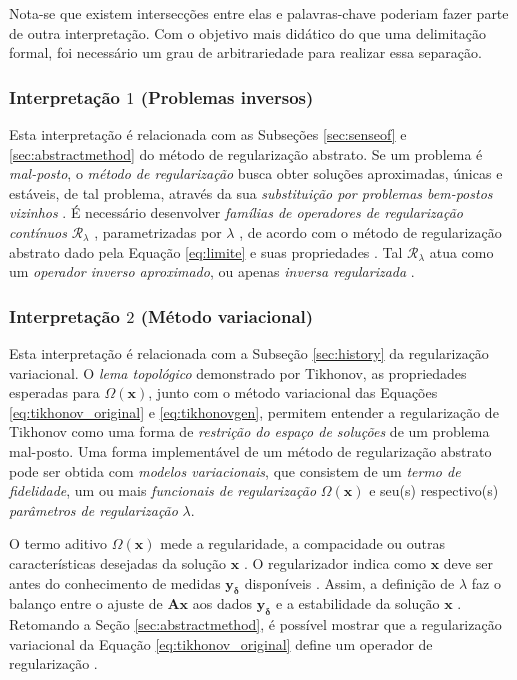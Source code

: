 Nota-se que existem intersecções entre elas e palavras-chave poderiam fazer parte de outra interpretação. Com o objetivo mais didático do que uma delimitação formal, foi necessário um grau de arbitrariedade para realizar essa separação. 



 

\subsubsection{Interpretação $1$ (Problemas inversos)}

Esta interpretação é relacionada com as Subseções \eqref{sec:senseof} e \eqref{sec:abstractmethod} do método de regularização abstrato. Se um problema é \textit{mal-posto}, o \textit{método de regularização} busca obter soluções aproximadas, únicas e estáveis, de tal problema, através da sua \textit{substituição por problemas bem-postos vizinhos} \cite{Vapnik2006, Woo2012}. É necessário desenvolver \textit{famílias de operadores de regularização contínuos} $\mathcal{R}_{\lambda}$ \cite{engl1996regularization}, parametrizadas por $\lambda$ \cite{Bertero2021, bleyer2015novel}, de acordo com o método de regularização abstrato dado pela Equação \eqref{eq:limite} e suas propriedades \cite[pág. 48]{Mueller2012}. Tal $\mathcal{R}_{\lambda}$ atua como um \textit{operador inverso aproximado}, ou apenas \textit{inversa regularizada} \cite[Seção 3.4]{Mueller2012}.


\subsubsection{Interpretação $2$ (Método variacional)}

Esta interpretação é relacionada com a Subseção \eqref{sec:history} da regularização variacional. O \textit{lema topológico} demonstrado por Tikhonov, as propriedades esperadas para $\Omega(\mathbf{x})$, junto com o método variacional das Equações \eqref{eq:tikhonov_original} e \eqref{eq:tikhonovgen}, permitem entender a regularização de Tikhonov como uma forma de \textit{restrição do espaço de soluções} de um problema mal-posto. Uma forma implementável de um método de regularização abstrato pode ser obtida com \textit{modelos variacionais}, que consistem de um \textit{termo de fidelidade}, um ou mais \textit{funcionais de regularização} $\Omega(\mathbf{x})$ e seu(s) respectivo(s) \textit{parâmetros de regularização} $\lambda$. 

O termo aditivo $\Omega(\mathbf{x})$ mede a regularidade, a compacidade \cite{Burger2021} ou outras características desejadas da solução $\mathbf{x}$ \cite{Arridge2019, hansen2010discrete}. O regularizador indica como $\mathbf{x}$ deve ser antes do conhecimento de medidas $\mathbf{y}_{\bm{\delta}}$ disponíveis \cite{bleyer2015novel}. Assim, a definição de $\lambda$ faz o balanço entre o ajuste de $\mathbf{A}\mathbf{x}$ aos dados $\mathbf{y}_{\bm{\delta}}$ e a estabilidade da solução $\mathbf{x}$ \cite{aster2019parameter}. Retomando a Seção \ref{sec:abstractmethod}, é possível mostrar que a regularização variacional da Equação \eqref{eq:tikhonov_original} define um operador de regularização \cite[Seção 5]{Benning2018}.

